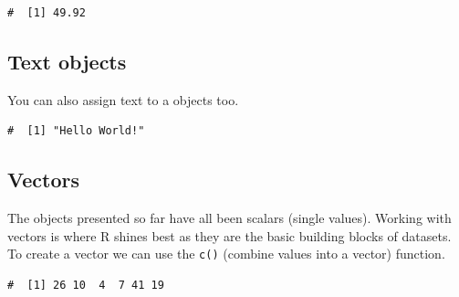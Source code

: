\documentclass[a4paper,9pt,twocolumn,twoside,printwatermark=false]{pinp}
\begin{document}
\begin{ShadedResult}
\begin{verbatim}
#  [1] 49.92
\end{verbatim}
\end{ShadedResult}

\subsection{Text objects}\label{text-objects}

You can also assign text to a objects too.

\begin{Shaded}
\begin{Highlighting}[]
\end{Highlighting}
\end{Shaded}

\begin{ShadedResult}
\begin{verbatim}
#  [1] "Hello World!"
\end{verbatim}
\end{ShadedResult}

\subsection{Vectors}\label{vectors}

The objects presented so far have all been scalars (single values).
Working with vectors is where R shines best as they are the basic
building blocks of datasets. To create a vector we can use the
\texttt{c()} (combine values into a vector) function.

\begin{Shaded}
\begin{Highlighting}[]
\StringTok{ }\NormalTok{(}\NormalTok{, }\NormalTok{, }\NormalTok{, }\NormalTok{, }\NormalTok{, }\NormalTok{)}
\end{Highlighting}
\end{Shaded}

\begin{ShadedResult}
\begin{verbatim}
#  [1] 26 10  4  7 41 19
\end{verbatim}
\end{ShadedResult}
\end{document}
